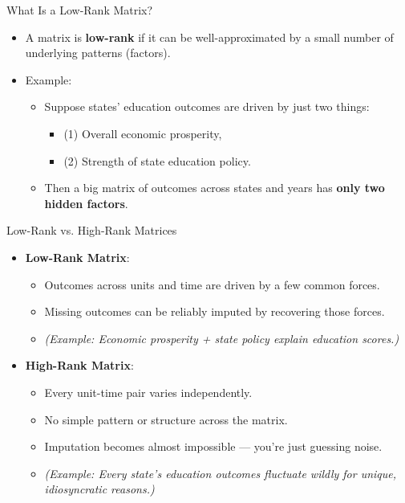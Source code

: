 \documentclass{beamer}
\begin{document}
\begin{frame}{What Is a Low-Rank Matrix?}
\small
\begin{itemize}
  \item A matrix is \textbf{low-rank} if it can be well-approximated by a small number of underlying patterns (factors).
  \item Example:
    \begin{itemize}
      \item Suppose states' education outcomes are driven by just two things:
      \begin{itemize}
        \item (1) Overall economic prosperity,
        \item (2) Strength of state education policy.
      \end{itemize}
      \item Then a big matrix of outcomes across states and years has \textbf{only two hidden factors}.
    \end{itemize}
\end{itemize}
\end{frame}


\begin{frame}{Low-Rank vs. High-Rank Matrices}
\small
\begin{itemize}
  \item \textbf{Low-Rank Matrix}:
  \begin{itemize}
    \item Outcomes across units and time are driven by a few common forces.
    \item Missing outcomes can be reliably imputed by recovering those forces.
    \item \textit{(Example: Economic prosperity + state policy explain education scores.)}
  \end{itemize}
  \vspace{0.3cm}
  \item \textbf{High-Rank Matrix}:
  \begin{itemize}
    \item Every unit-time pair varies independently.
    \item No simple pattern or structure across the matrix.
    \item Imputation becomes almost impossible — you're just guessing noise.
    \item \textit{(Example: Every state's education outcomes fluctuate wildly for unique, idiosyncratic reasons.)}
  \end{itemize}
\end{itemize}
\end{frame}
\end{document}
